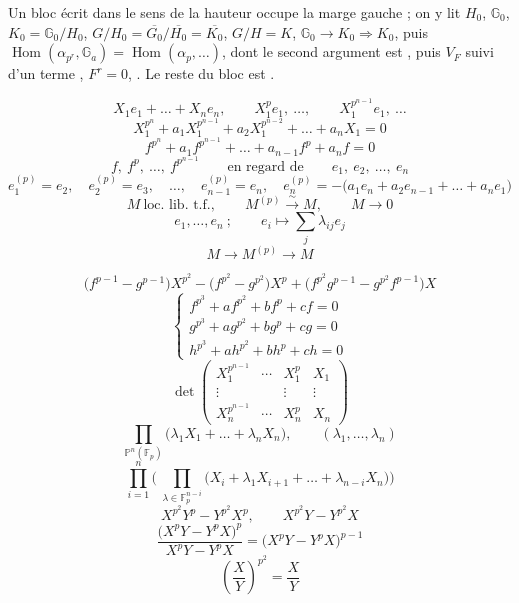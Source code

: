 \documentclass[11pt,a4paper]{article}
\begin{document}
Un bloc écrit dans le sens de la hauteur occupe la marge gauche ; on y lit
$H_0$, $\mathbb{G}_0$, $K_0 = \mathbb{G}_0/H_0$, $G/H_0 = \overline{G_0}/\overline{H_0} = \overline{K_0}$,
$G/H = K$, $\mathbb{G}_0 \to K_0 \Rightarrow K_0$, puis
$\operatorname{Hom}(\alpha_{p^r}, \mathbb{G}_a) = \operatorname{Hom}(\alpha_p, \ldots)$,
dont le second argument est \ill{}, puis $V_F$ suivi d'un terme \ill{},
$F^r = 0$, .
Le reste du bloc est \ill{}.

\[
  X_1 e_1 + \dots + X_n e_n, \qquad X_1^{p} e_1, \ \dots, \qquad X_1^{p^{n-1}} e_1, \ \dots
\]
\[
  X_1^{p^n} + a_1 X_1^{p^{n-1}} + a_2 X_1^{p^{n-2}} + \dots + a_n X_1 = 0
\]
\[
  f^{p^n} + a_1 f^{p^{n-1}} + \dots + a_{n-1} f^{p} + a_n f = 0
\]
\[
  f, \ f^{p}, \ \dots, \ f^{p^{n-1}} \qquad\text{en regard de}\qquad e_1, \ e_2, \ \dots, \ e_n
\]
\[
  e_1^{(p)} = e_2, \quad e_2^{(p)} = e_3, \quad \dots, \quad e_{n-1}^{(p)} = e_n,
  \quad e_n^{(p)} = -\bigl(a_1 e_n + a_2 e_{n-1} + \dots + a_n e_1\bigr)
\]
\[
  M \ \text{loc.\ lib.\ t.f.}, \qquad M^{(p)} \xrightarrow{\ \sim\ } M, \qquad
  M \longrightarrow 0
\]
\[
  e_1, \dots, e_n \ ; \qquad e_i \longmapsto \sum_j \lambda_{ij} e_j
\]
\[
  M \longrightarrow M^{(p)} \longrightarrow M
\]

\[
  \bigl(f^{p-1} - g^{p-1}\bigr) X^{p^2} - \bigl(f^{p^2} - g^{p^2}\bigr) X^{p}
  + \bigl(f^{p^2} g^{p-1} - g^{p^2} f^{p-1}\bigr) X
\]
\[
  \begin{cases}
    f^{p^3} + a f^{p^2} + b f^{p} + c f = 0 \\
    g^{p^3} + a g^{p^2} + b g^{p} + c g = 0 \\
    h^{p^3} + a h^{p^2} + b h^{p} + c h = 0
  \end{cases}
\]
\[
  \det\begin{pmatrix}
    X_1^{p^{n-1}} & \cdots & X_1^{p} & X_1 \\
    \vdots & & \vdots & \vdots \\
    X_n^{p^{n-1}} & \cdots & X_n^{p} & X_n
  \end{pmatrix}
\]
\struck{\ill{}}
\[
  \prod_{\mathbb{P}^n(\mathbb{F}_p)} \bigl(\lambda_1 X_1 + \dots + \lambda_n X_n\bigr),
  \qquad (\lambda_1, \dots, \lambda_n)
\]
\[
  \prod_{i=1}^{n} \Biggl(\ \prod_{\lambda \in \mathbb{F}_p^{n-i}}
  \bigl(X_i + \lambda_1 X_{i+1} + \dots + \lambda_{n-i} X_n\bigr)\Biggr)
\]
\[
  X^{p^2} Y^{p} - Y^{p^2} X^{p}, \qquad X^{p^2} Y - Y^{p^2} X
\]
\[
  \frac{\bigl(X^{p}Y - Y^{p}X\bigr)^{p}}{X^{p}Y - Y^{p}X} = \bigl(X^{p}Y - Y^{p}X\bigr)^{p-1}
\]
\[
  \left(\frac{X}{Y}\right)^{p^2} = \frac{X}{Y}
\]
\ill{}
\end{document}
